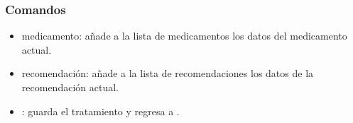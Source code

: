 \subsubsection{Comandos}
	\begin{itemize}
	    \item {} medicamento: añade a la lista de medicamentos los datos del medicamento actual. 
	    \item {} recomendación: añade a la lista de recomendaciones los datos de la recomendación actual.
	    \item {}: guarda el tratamiento y regresa a . 
	\end{itemize}

